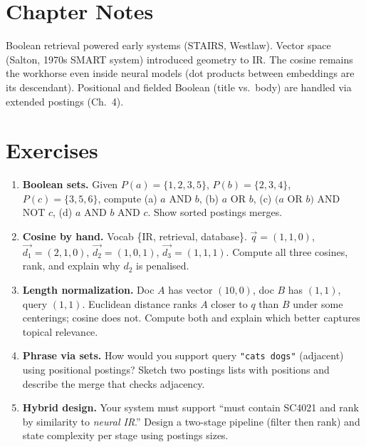 \section{Chapter Notes}
Boolean retrieval powered early systems (STAIRS, Westlaw). Vector space (Salton, 1970s SMART system) introduced geometry to IR. The cosine remains the workhorse even inside neural models (dot products between embeddings are its descendant). Positional and fielded Boolean (title vs.\ body) are handled via extended postings (Ch.~4).

\section{Exercises}
\begin{enumerate}[label=E2.\arabic*, leftmargin=*, itemsep=0.6em]
  \item \textbf{Boolean sets.} Given $P(a)=\{1,2,3,5\}$, $P(b)=\{2,3,4\}$, $P(c)=\{3,5,6\}$, compute (a) $a$ AND $b$, (b) $a$ OR $b$, (c) $(a$ OR $b)$ AND NOT $c$, (d) $a$ AND $b$ AND $c$. Show sorted postings merges.
  \item \textbf{Cosine by hand.} Vocab \{IR, retrieval, database\}. $\vec{q}=(1,1,0)$, $\vec{d_1}=(2,1,0)$, $\vec{d_2}=(1,0,1)$, $\vec{d_3}=(1,1,1)$. Compute all three cosines, rank, and explain why $d_2$ is penalised.
  \item \textbf{Length normalization.} Doc $A$ has vector $(10,0)$, doc $B$ has $(1,1)$, query $(1,1)$. Euclidean distance ranks $A$ closer to $q$ than $B$ under some centerings; cosine does not. Compute both and explain which better captures topical relevance.
  \item \textbf{Phrase via sets.} How would you support query \texttt{"cats dogs"} (adjacent) using positional postings? Sketch two postings lists with positions and describe the merge that checks adjacency.
  \item \textbf{Hybrid design.} Your system must support ``must contain SC4021 and rank by similarity to \emph{neural IR}.'' Design a two-stage pipeline (filter then rank) and state complexity per stage using postings sizes.
\end{enumerate}

